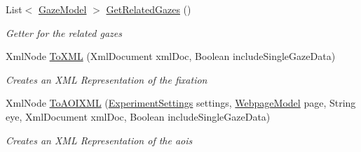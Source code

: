 \begin{DoxyCompactItemize}
List$<$ \hyperlink{class_web_analyzer_1_1_models_1_1_data_model_1_1_gaze_model}{Gaze\+Model} $>$ \hyperlink{class_web_analyzer_1_1_models_1_1_analysis_model_1_1_fixation_model_afd82114a1c8126e23215962e4cf135f8}{Get\+Related\+Gazes} ()
\begin{DoxyCompactList}\small\item\em Getter for the related gazes \end{DoxyCompactList}\item 
Xml\+Node \hyperlink{class_web_analyzer_1_1_models_1_1_analysis_model_1_1_fixation_model_a4f11e23a31e060973c751e67f9a2ff9f}{To\+X\+M\+L} (Xml\+Document xml\+Doc, Boolean include\+Single\+Gaze\+Data)
\begin{DoxyCompactList}\small\item\em Creates an X\+M\+L Representation of the fixation \end{DoxyCompactList}\item 
Xml\+Node \hyperlink{class_web_analyzer_1_1_models_1_1_analysis_model_1_1_fixation_model_ac235ff98ad7edc4465c7efa9d919630e}{To\+A\+O\+I\+X\+M\+L} (\hyperlink{class_web_analyzer_1_1_models_1_1_settings_model_1_1_experiment_settings}{Experiment\+Settings} settings, \hyperlink{class_web_analyzer_1_1_models_1_1_data_model_1_1_webpage_model}{Webpage\+Model} page, String eye, Xml\+Document xml\+Doc, Boolean include\+Single\+Gaze\+Data)
\begin{DoxyCompactList}\small\item\em Creates an X\+M\+L Representation of the aois \end{DoxyCompactList}\end{DoxyCompactItemize}
